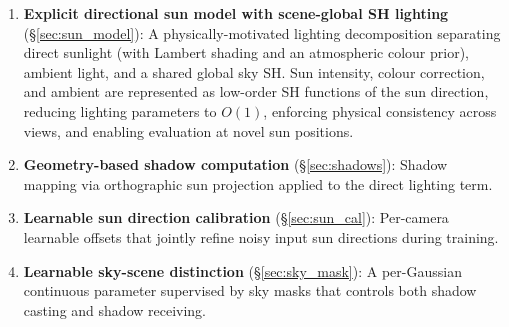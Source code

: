 \begin{enumerate}
    \item \textbf{Explicit directional sun model with scene-global SH lighting} (\S\ref{sec:sun_model}): A physically-motivated lighting decomposition separating direct sunlight (with Lambert shading and an atmospheric colour prior), ambient light, and a shared global sky SH. Sun intensity, colour correction, and ambient are represented as low-order SH functions of the sun direction, reducing lighting parameters to $O(1)$, enforcing physical consistency across views, and enabling evaluation at novel sun positions.

    \item \textbf{Geometry-based shadow computation} (\S\ref{sec:shadows}): Shadow mapping via orthographic sun projection applied to the direct lighting term.

    \item \textbf{Learnable sun direction calibration} (\S\ref{sec:sun_cal}): Per-camera learnable offsets that jointly refine noisy input sun directions during training.

    \item \textbf{Learnable sky-scene distinction} (\S\ref{sec:sky_mask}): A per-Gaussian continuous parameter supervised by sky masks that controls both shadow casting and shadow receiving.
\end{enumerate}
